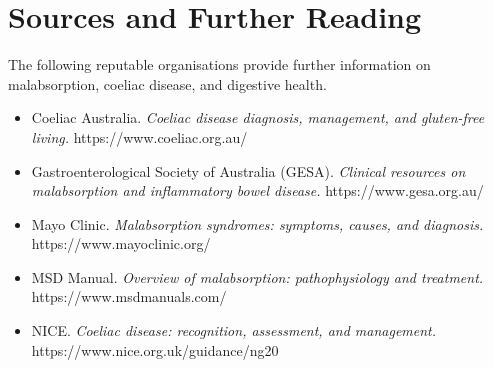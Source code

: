 \section*{Sources and Further Reading}
The following reputable organisations provide further information on malabsorption, coeliac disease, and digestive health.
\begin{itemize}
    \item Coeliac Australia. \textit{Coeliac disease diagnosis, management, and gluten-free living.} https://www.coeliac.org.au/
    \item Gastroenterological Society of Australia (GESA). \textit{Clinical resources on malabsorption and inflammatory bowel disease.} https://www.gesa.org.au/
    \item Mayo Clinic. \textit{Malabsorption syndromes: symptoms, causes, and diagnosis.} https://www.mayoclinic.org/
    \item MSD Manual. \textit{Overview of malabsorption: pathophysiology and treatment.} https://www.msdmanuals.com/
    \item NICE. \textit{Coeliac disease: recognition, assessment, and management.} https://www.nice.org.uk/guidance/ng20
\end{itemize}
